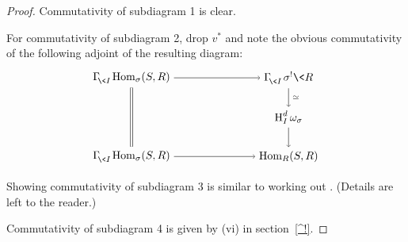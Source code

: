 \documentclass{compositio}
\theoremstyle{plain}
\theoremstyle{definition}
\theoremstyle{remark}
\numberwithin{equation}{thm}
\begin{document}
\begin{proof} Commutativity of subdiagram {\textcircled{\scriptsize{1}}} is clear.

For commutativity of subdiagram {\textcircled{\scriptsize{2}}}, drop  $v^*$ and note the obvious commutativity of  the following adjoint of the resulting diagram:
\[

 \begin{tikzpicture}[xscale=5, yscale=1.25]

   \node(11) at (1,-1){$\Gamma^{}_{\!{\mkern-1mu}\<I}{\mkern-1mu}\operatorname{Hom}_\sigma(S,R)$};
   \node(12) at (2,-1){$\Gamma^{}_{\!{\mkern-1mu}\<I}{\mkern1mu}{\mkern1mu}\sigma^!\<R$};   
 
   \node(22) at (2,-2){$\textup{H}^d_I\,\omega_\sigma$};   
    
   \node(31) at (1,-3){$\Gamma^{}_{\!{\mkern-1mu}\<I}{\mkern-1mu}\operatorname{Hom}_\sigma(S,R)$};
   \node(32) at (2,-3){$\operatorname{Hom}_R(S,R)$};
   
  
   \draw[->] (11)--(12) ;
   \draw[->] (31)--(32) ;

 
   \draw[double distance=2pt] (11)--(31) ;
  
   \draw[->] (12)--(22) node[right=1pt, midway, scale=.75]{$\simeq$}; 
   \draw[->] (22)--(32) ;    
   
  \end{tikzpicture}
\]

Showing commutativity of subdiagram {\textcircled{\scriptsize{3}}} is similar to working out
\cite[Exercise 3.10.4(b)]{li}. (Details are left to the reader.)

Commutativity of subdiagram {\textcircled{\scriptsize{4}}} is given by (vi) in section~\ref{^!}.
\end{proof}
\end{document}
